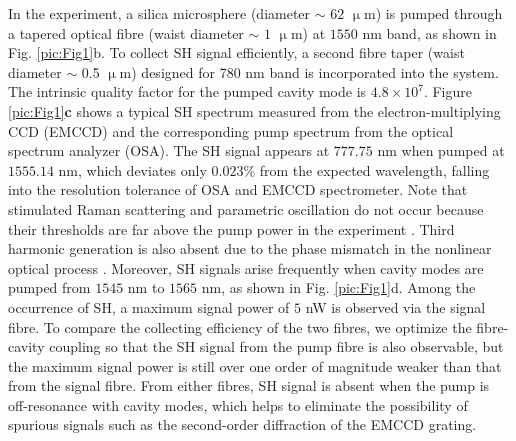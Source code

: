 \documentclass[a4paper,8pt,hyperref, twocolumn, aps, prl]{article}
\begin{document}
In the experiment, a silica microsphere (diameter $\sim$ $62$ $\upmu$m) 
is pumped through a tapered optical fibre (waist diameter $\sim$ $1$ $\upmu$m) at $1550$ nm band, as shown in Fig. \ref{pic:Fig1}b. To collect SH signal efficiently, a second fibre taper (waist diameter $\sim$ 0.5 $\upmu$m) designed for 780 nm band is incorporated into the system. The intrinsic quality factor for the pumped cavity mode is $4.8\times10^7$. 
Figure \ref{pic:Fig1}\textbf{c} shows a typical SH spectrum measured from the electron-multiplying CCD (EMCCD) and the corresponding pump spectrum from the optical spectrum analyzer (OSA). The SH signal appears at $777.75$ nm when pumped at $1555.14$ nm, which deviates only $0.023$\% from the expected wavelength, falling into the resolution tolerance of OSA and EMCCD spectrometer.
Note that stimulated Raman scattering and parametric oscillation do not occur because their thresholds are far above the pump power in the experiment \cite{spillane2002ultralow, del2007optical}. 
Third harmonic generation is also absent due to the phase mismatch in the nonlinear optical process \cite{carmon2007visible}.
Moreover, SH signals arise frequently when cavity modes are pumped from $1545$ nm to $1565$ nm, as shown in Fig. \ref{pic:Fig1}d.
Among the occurrence of SH, a maximum signal power of $5$ nW is observed via the signal fibre. To compare the collecting efficiency of the two fibres, we optimize the fibre-cavity coupling so that the SH signal from the pump fibre is also observable, but the maximum signal power is still over one order of magnitude weaker than that from the signal fibre. From either fibres, SH signal is absent when the pump is off-resonance with cavity modes, which helps to eliminate the possibility of spurious signals such as the second-order diffraction of the EMCCD grating.
\end{document}
